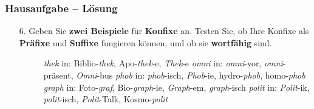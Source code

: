 \begin{frame}
\frametitle{Hausaufgabe -- Lösung}

\begin{enumerate}
	
	\item[6.] Geben Sie \textbf{zwei Beispiele} für \textbf{Konfixe} an. Testen Sie, ob Ihre Konfixe als \textbf{Präfixe} und \textbf{Suffixe} fungieren können, und ob sie \textbf{wortfähig} sind. 
	
	{\color{red}
	\begin{description}
		\item[] \textbf{}
		
		\ea 
		\ea \emph{thek} in: Biblio-\emph{thek}, Apo-\emph{thek}-e, \emph{Thek}-e%
		\ex \emph{omni} in: \emph{omni}-vor, \emph{omni}-präsent, \emph{Omni}-bus%
		\ex \emph{phob} in: \emph{phob}-isch, \emph{Phob}-ie, hydro-\emph{phob}, homo-\emph{phob}%
		\ex \emph{graph} in: Foto-\emph{graf}, Bio-\emph{graph}-ie, \emph{Graph}-em, \emph{graph}-isch%
		\ex \emph{polit} in: \emph{Polit}-ik, \emph{polit}-isch, \emph{Polit}-Talk, Kosmo-\emph{polit}%
	\z 
	\z 

	\end{description}
}
\end{enumerate}

\end{frame}